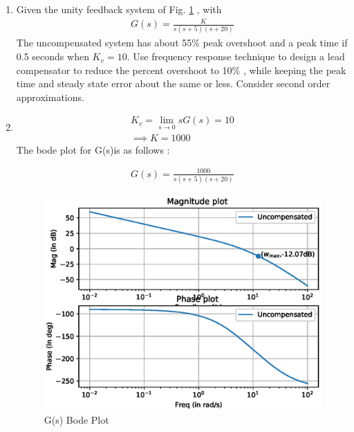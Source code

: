 
\begin{enumerate}[label=\thesection.\arabic*.,ref=\thesection.\theenumi]

\item
Given the unity feedback system of Fig. \ref{fig:ee18btech11026_block_1} , with 
\begin{align}
    G(s) = \frac{K}{s(s+5)(s+20)}
\end{align}
The uncompensated system has about 55\% peak overshoot and a peak time if 0.5 seconds when $K_{v} = 10$. Use frequency response technique to design a lead compensator to reduce the percent overshoot to 10\% , while keeping the peak time and steady state error about the same or less.
Consider second order approximations.
\begin{figure}[!ht]
\begin{center}
\end{center}
    \caption{}
    \label{fig:ee18btech11026_block_1}
\end{figure}

\item
\solution

\begin{align}
    K_{v} = \lim_{s \to 0} s G(s) = 10\\
    \implies K = 1000
\end{align}
The bode plot for G(s)is as follows : 

\begin{align}
    G(s) = \frac{1000}{s(s+5)(s+20)}
\end{align}

\begin{figure}[!h]
    \centering
    \includegraphics[width=\columnwidth]{./figs/ee18btech11026/ee18btech11026_1.eps}
    \caption{G(s) Bode Plot}
    \label{fig:ee18btech11026_1}
\end{figure}


\end{enumerate}
